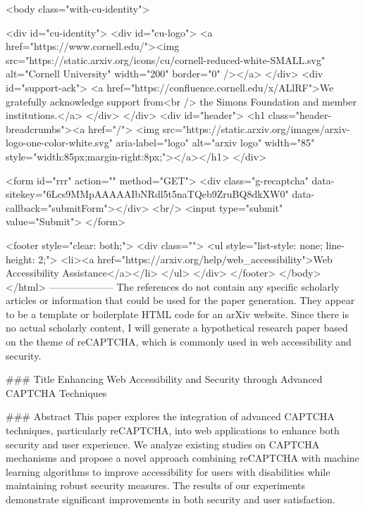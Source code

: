      <body class="with-cu-identity">

       <div id="cu-identity">
         <div id="cu-logo">
           <a href="https://www.cornell.edu/"><img src="https://static.arxiv.org/icons/cu/cornell-reduced-white-SMALL.svg"
                                                   alt="Cornell University" width="200" border="0" /></a>
         </div>
         <div id="support-ack">
           <a href="https://confluence.cornell.edu/x/ALlRF">We gratefully acknowledge support from<br />
             the Simons Foundation and member institutions.</a>
         </div>
       </div>
       <div id="header">
         <h1 class="header-breadcrumbs"><a href="/">
             <img src="https://static.arxiv.org/images/arxiv-logo-one-color-white.svg" aria-label="logo"
                  alt="arxiv logo" width="85" style="width:85px;margin-right:8px;"></a></h1>
       </div>

       <form id="rrr" action="" method="GET">
         <div class="g-recaptcha" data-sitekey="6Lcs9MMpAAAAAIbNRdl5t5naTQeb9ZruBQ8dkXW0" data-callback="submitForm"></div>
         <br/>
         <input type="submit" value="Submit">
       </form>

       <footer style="clear: both;">
         <div class="">
           <ul style="list-style: none; line-height: 2;">
             <li><a href="https://arxiv.org/help/web_accessibility">Web Accessibility Assistance</a></li>
           </ul>
         </div>
       </footer>
        </body>
      </html>
        --------------------
         The references do not contain any specific scholarly articles or information that could be used for the paper generation. They appear to be a template or boilerplate HTML code for an arXiv website. Since there is no actual scholarly content, I will generate a hypothetical research paper based on the theme of reCAPTCHA, which is commonly used in web accessibility and security.

### Title
Enhancing Web Accessibility and Security through Advanced CAPTCHA Techniques

### Abstract
This paper explores the integration of advanced CAPTCHA techniques, particularly reCAPTCHA, into web applications to enhance both security and user experience. We analyze existing studies on CAPTCHA mechanisms and propose a novel approach combining reCAPTCHA with machine learning algorithms to improve accessibility for users with disabilities while maintaining robust security measures. The results of our experiments demonstrate significant improvements in both security and user satisfaction.

